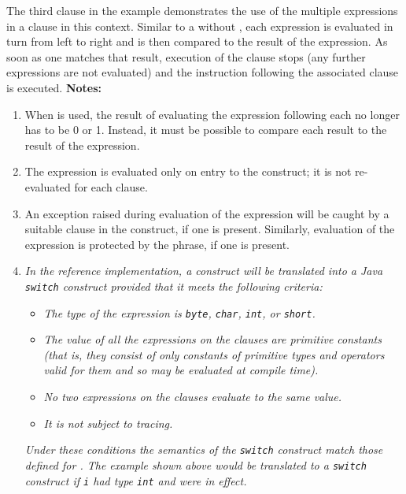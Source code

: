 The third  clause in the example demonstrates the use of the
multiple expressions in a  clause in this context.
Similar to a  without , each
expression is evaluated in turn from left to right and is then
compared to the result of the  expression.
As soon as one matches that result, execution of the
 clause stops (any further expressions are not
evaluated) and the instruction following the associated
 clause is executed.
 \textbf{Notes:}
\begin{enumerate}
\item When  is used, the result of evaluating the expression
following each  no longer has to be 0 or 1.  Instead, it
must be possible to compare each result to the result of the
 expression.
\item 
The  expression is evaluated only on entry to the
 construct; it is not re-evaluated for each 
clause.
\item 
An exception raised during evaluation of the  expression
will be caught by a suitable  clause in the construct, if
one is present.
Similarly, evaluation of the  expression is protected by
the  phrase, if one is present.
\item 
\emph{In the reference implementation, a  construct will
be translated into a Java \texttt{switch} construct provided that it
meets the following criteria:}
\begin{itemize}
\item 
\emph{The type of the  expression
is \texttt{byte}, \texttt{char}, \texttt{int}, or \texttt{short}.}
\item 
\emph{The value of all the expressions on the  clauses are
primitive constants (that is, they consist of only constants of
primitive types and operators valid for them and so may be evaluated at
compile time).}
\item 
\emph{No two expressions on the  clauses evaluate to the same
value.}
\item 
\emph{It is not subject to tracing.}
\end{itemize}
\emph{Under these conditions the semantics of the \texttt{switch} construct
match those defined for .  The example shown above would
be translated to a \texttt{switch} construct if \texttt{i} had type \texttt{int}
and  were in effect.}
\end{enumerate}
